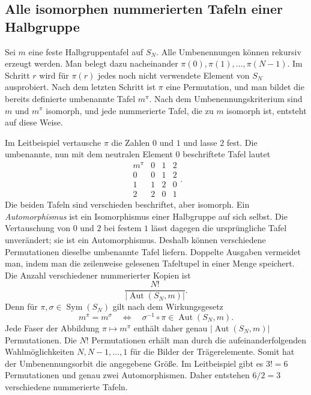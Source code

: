 \documentclass[main.tex]{subfiles}
\begin{document}
\subsection{Alle isomorphen nummerierten Tafeln einer Halbgruppe}

Sei \(m\) eine feste Halbgruppentafel auf \(S_N\).  Alle Umbenennungen können
rekursiv erzeugt werden.  Man belegt dazu nacheinander
\(\pi(0),\pi(1),\ldots,\pi(N-1)\).  Im Schritt \(r\) wird für \(\pi(r)\)
jedes noch nicht verwendete Element von \(S_N\) ausprobiert.  Nach dem letzten
Schritt ist \(\pi\) eine Permutation, und man bildet die bereits definierte
umbenannte Tafel \(m^\pi\).  Nach dem Umbenennungskriterium sind \(m\) und
\(m^\pi\) isomorph, und jede
nummerierte Tafel, die zu \(m\) isomorph ist, entsteht auf diese Weise.

Im Leitbeispiel vertausche \(\pi\) die Zahlen \(0\) und \(1\) und lasse \(2\)
fest.  Die umbenannte, nun mit dem neutralen Element \(0\) beschriftete Tafel
lautet
\[
\begin{array}{c|ccc}
m^\pi&0&1&2\\\hline
0&0&1&2\\
1&1&2&0\\
2&2&0&1
\end{array}.
\]
Die beiden Tafeln sind verschieden beschriftet, aber isomorph.  Ein
\emph{Automorphismus} ist ein Isomorphismus einer Halbgruppe auf sich selbst.
Die Vertauschung von \(0\) und \(2\) bei festem \(1\) lässt dagegen die
ursprüngliche Tafel unverändert; sie ist ein Automorphismus.  Deshalb können
verschiedene Permutationen dieselbe umbenannte Tafel liefern.  Doppelte
Ausgaben vermeidet man, indem man die zeilenweise gelesenen Tafeltupel in
einer Menge speichert.  Die Anzahl verschiedener nummerierter Kopien ist
\[
  \frac{N!}{|\operatorname{Aut}(S_N,m)|}.
\]
Denn für \(\pi,\sigma\in\operatorname{Sym}(S_N)\) gilt nach dem
Wirkungsgesetz
\[
  m^\pi=m^\sigma
  \quad\Longleftrightarrow\quad
  \sigma^{-1}\circ\pi\in\operatorname{Aut}(S_N,m).
\]
Jede Faser der Abbildung \(\pi\mapsto m^\pi\) enthält daher genau
\(\lvert\operatorname{Aut}(S_N,m)\rvert\) Permutationen.  Die \(N!\)
Permutationen erhält man durch die aufeinanderfolgenden
Wahlmöglichkeiten \(N,N-1,\ldots,1\) für die Bilder der Trägerelemente.
Somit hat der Umbenennungsorbit die angegebene Größe.
Im Leitbeispiel gibt es \(3!=6\) Permutationen und genau zwei
Automorphismen.  Daher entstehen \(6/2=3\) verschiedene nummerierte Tafeln.


\end{document}
